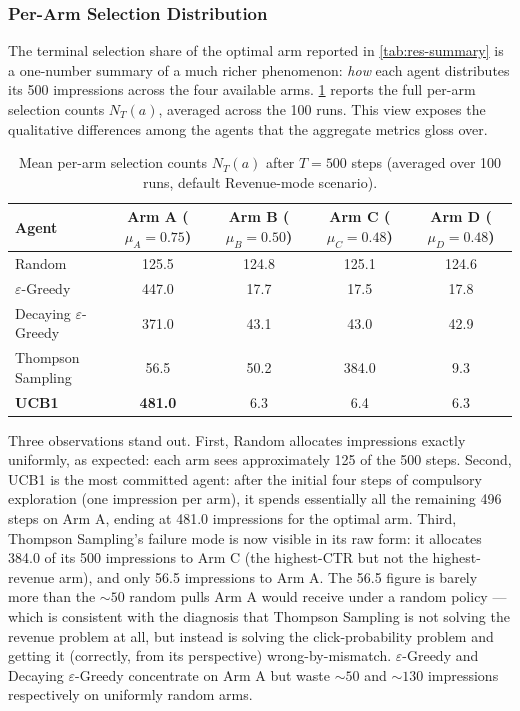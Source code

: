 \subsubsection{Per-Arm Selection Distribution}
The terminal selection share of the optimal arm reported in \cref{tab:res-summary} is a one-number summary of a much richer phenomenon: \emph{how} each agent distributes its 500 impressions across the four available arms. \cref{tab:per-arm} reports the full per-arm selection counts $N_T(a)$, averaged across the 100 runs. This view exposes the qualitative differences among the agents that the aggregate metrics gloss over.

\begin{table}[H]
\centering
\caption{Mean per-arm selection counts $N_T(a)$ after $T = 500$ steps (averaged over 100 runs, default Revenue-mode scenario).}
\label{tab:per-arm}
\small
\renewcommand{\arraystretch}{1.2}
\begin{tabular}{lcccc}
\toprule
\textbf{Agent} & \textbf{Arm A} ($\mu_A=0.75$) & \textbf{Arm B} ($\mu_B=0.50$) & \textbf{Arm C} ($\mu_C=0.48$) & \textbf{Arm D} ($\mu_D=0.48$)\\
\midrule
Random                          & 125.5 & 124.8 & 125.1 & 124.6\\
$\varepsilon$-Greedy            & 447.0 & 17.7  & 17.5  & 17.8\\
Decaying $\varepsilon$-Greedy   & 371.0 & 43.1  & 43.0  & 42.9\\
Thompson Sampling               & 56.5  & 50.2  & 384.0 & 9.3\\
\textbf{UCB1}                   & \textbf{481.0} & 6.3   & 6.4   & 6.3\\
\bottomrule
\end{tabular}
\end{table}

Three observations stand out. First, Random allocates impressions exactly uniformly, as expected: each arm sees approximately 125 of the 500 steps. Second, UCB1 is the most committed agent: after the initial four steps of compulsory exploration (one impression per arm), it spends essentially all the remaining 496 steps on Arm A, ending at 481.0 impressions for the optimal arm. Third, Thompson Sampling's failure mode is now visible in its raw form: it allocates 384.0 of its 500 impressions to Arm C (the highest-CTR but not the highest-revenue arm), and only 56.5 impressions to Arm A. The 56.5 figure is barely more than the $\sim 50$ random pulls Arm A would receive under a random policy --- which is consistent with the diagnosis that Thompson Sampling is not solving the revenue problem at all, but instead is solving the click-probability problem and getting it (correctly, from its perspective) wrong-by-mismatch. $\varepsilon$-Greedy and Decaying $\varepsilon$-Greedy concentrate on Arm A but waste $\sim 50$ and $\sim 130$ impressions respectively on uniformly random arms.

